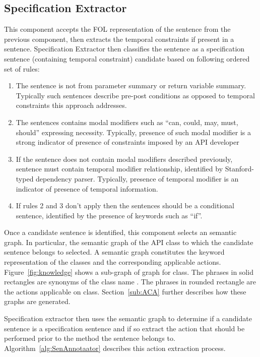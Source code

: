 \subsection{Specification Extractor}
\label{sub:SE}

This component accepts the FOL representation of the sentence from the previous component,
then extracts the temporal constraints if present in a sentence. 
Specification Extractor then classifies the sentence as a specification 
sentence (containing temporal constraint) candidate based on following ordered set of rules:

\begin{enumerate}
	\item The sentence is not from parameter summary or return variable summary.
	Typically such sentences describe pre-post conditions as opposed to temporal constraints this approach addresses.
	\item The sentences contains modal modifiers such as ``can, could, may, must, should'' expressing necessity.
	Typically, presence of such modal modifier is a strong indicator of presence of constraints imposed by an API developer
	\item If the sentence does not contain modal modifiers described previously, sentence must contain temporal modifier relationship, identified by Stanford-typed dependency parser.
	Typically, presence of temporal modifier is an indicator of presence of temporal information.  
	\item If rules 2 and 3 don't apply then the sentences should be a conditional sentence, identified by the presence of keywords such as ``if''.
\end{enumerate} 

Once a candidate sentence is identified, this component selects an semantic graph.
In particular, the semantic graph of the API class to which the candidate sentence belongs to selected.
A semantic graph constitutes the keyword representation of the classes and the corresponding applicable actions. 
Figure~\ref{fig:knowledge} shows a sub-graph of  graph for  class.
The phrases in solid rectangles are synonyms of the class name .
The phrases in rounded rectangle are the actions applicable on  class.
Section~\ref{sub:ACA} further describes how these graphs are generated.

 
Specification extractor then uses the semantic graph to determine
if a candidate sentence is a specification sentence and if so extract
the action that should be performed prior to the method the sentence
belongs to. Algorithm~\ref{alg:SenAnnotaator} describes this action extraction
process.  

